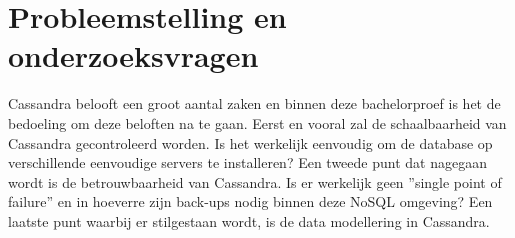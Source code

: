 \section{Probleemstelling en onderzoeksvragen}
\label{sec:onderzoeksvragen}


Cassandra belooft een groot aantal zaken en binnen deze bachelorproef is het de bedoeling om deze beloften na te gaan.
Eerst en vooral zal de schaalbaarheid van Cassandra gecontroleerd worden.
Is het werkelijk eenvoudig om de database op verschillende eenvoudige servers te installeren?
Een tweede punt dat nagegaan wordt is de betrouwbaarheid van Cassandra.
Is er werkelijk geen ''single point of failure'' en in hoeverre zijn back-ups nodig binnen deze NoSQL omgeving?
Een laatste punt waarbij er stilgestaan wordt, is de data modellering in Cassandra.